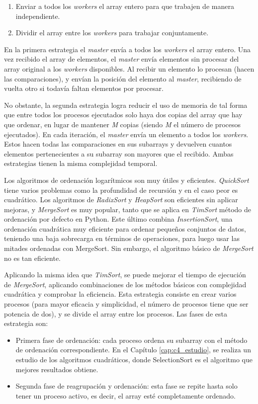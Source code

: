 	\begin{enumerate}
		\item Enviar a todos los \textit{workers} el array entero para que trabajen de manera independiente.
		\item Dividir el array entre los \textit{workers} para trabajar conjuntamente.
	\end{enumerate}
	
	En la primera estrategia el \textit{master} envía a todos los \textit{workers} el array entero. Una vez recibido el array de elementos, el \textit{master} envía elementos sin procesar del array original a los \textit{workers} disponibles. Al recibir un elemento lo procesan (hacen las comparaciones), y envían la posición del elemento al \textit{master}, recibiendo de vuelta otro si todavía faltan elementos por procesar. 
	
	No obstante, la segunda estrategia logra reducir el uso de memoria de tal forma que entre todos los procesos ejecutados solo haya dos copias del array que hay que ordenar, en lugar de mantener \textit{M} copias (siendo \textit{M} el número de procesos ejecutados). En cada iteración, el \textit{master} envía un elemento a todos los \textit{workers}. Estos hacen todas las comparaciones en sus subarrays y devuelven cuantos elementos pertenecientes a su subarray son mayores que el recibido. Ambas estrategias tienen la misma complejidad temporal.



	Los algoritmos de ordenación logarítmicos son muy útiles y eficientes. \textit{QuickSort} tiene varios problemas como la profundidad de recursión y en el caso peor es cuadrático. Los algoritmos de \textit{RadixSort} y \textit{HeapSort} son eficientes sin aplicar mejoras, y \textit{MergeSort} es muy popular, tanto que se aplica en \textit{TimSort}\cite{auger2015merge} método de ordenación por defecto en Python. Este último combina \textit{InsertionSort}, una ordenación cuadrática muy eficiente para ordenar pequeños conjuntos de datos, teniendo una baja sobrecarga en términos de operaciones, para luego usar las mitades ordenadas con MergeSort. Sin embargo, el algoritmo básico de \textit{MergeSort} no es tan eficiente.
	
	Aplicando la misma idea que \textit{TimSort}, se puede mejorar el tiempo de ejecución de \textit{MergeSort}, aplicando combinaciones de los métodos básicos con complejidad cuadrática y comprobar la eficiencia. Esta estrategia consiste en crear varios procesos (para mayor eficacia y simplicidad, el número de procesos tiene que ser potencia de dos), y se divide el array entre los procesos. Las fases de esta estrategia son:
	\begin{itemize}
		\item Primera fase de ordenación: cada proceso ordena su subarray con el método de ordenación correspondiente. En el Capítulo \ref{cap:c4_estudio}, se realiza un estudio de los algoritmos cuadráticos, donde SelectionSort es el algoritmo que mejores resultados obtiene.
		\item Segunda fase de reagrupación y ordenación: esta fase se repite hasta solo tener un proceso activo, es decir, el array esté completamente ordenado.
	\end{itemize}
	
